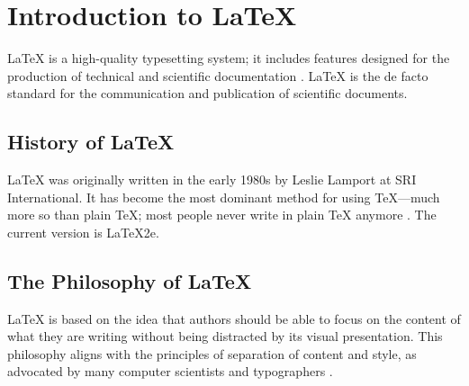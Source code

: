 \chapter{Introduction to LaTeX}
\label{chap:intro}

LaTeX is a high-quality typesetting system; it includes features designed for the production of technical and scientific documentation \cite{latexcompanion}. LaTeX is the de facto standard for the communication and publication of scientific documents.

\section{History of LaTeX}
LaTeX was originally written in the early 1980s by Leslie Lamport at SRI International. It has become the most dominant method for using TeX—much more so than plain TeX; most people never write in plain TeX anymore \cite{einstein}. The current version is LaTeX2e.

\section{The Philosophy of LaTeX}
LaTeX is based on the idea that authors should be able to focus on the content of what they are writing without being distracted by its visual presentation. This philosophy aligns with the principles of separation of content and style, as advocated by many computer scientists and typographers \cite{knuthwebsite}.

